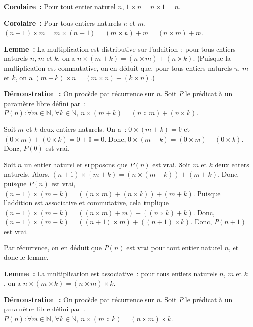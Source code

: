    \done 

\medskip

\noindent\textbf{Corolaire :} Pour tout entier naturel $n$, $1 \times n = n \times 1 = n$. 

\medskip

\noindent\textbf{Corolaire :} Pour tous entiers naturels $n$ et $m$, $(n+1) \times m = m \times (n+1) = (m \times n) + m = (n \times m) + m$. 

\medskip

\noindent\textbf{Lemme :} La multiplication est distributive sur l'addition : pour tous entiers naturels $n$, $m$ et $k$, on a $n \times (m + k) = (n \times m) + (n \times k)$.
    (Puisque la multiplication est commutative, on en déduit que, pour tous entiers naturels $n$, $m$ et $k$, on a $(m + k) \times n = (m \times n) + (k \times n)$.)

\medskip

\noindent\textbf{Démonstration :} On procède par récurrence sur $n$. 
    Soit $P$ le prédicat à un paramètre libre défini par : $P(n): \forall m \in \mathbb{N}, \, \forall k \in \mathbb{N}, \, n \times (m + k) = (n \times m) + (n \times k)$.

    Soit $m$ et $k$ deux entiers naturels. 
    On a : $0 \times (m+k) = 0$ et $(0 \times m) + (0 \times k) = 0 + 0 = 0$. 
    Donc, $0 \times (m+k) = (0 \times m) + (0 \times k)$. 
    Donc, $P(0)$ est vrai. 

    Soit $n$ un entier naturel et supposons que $P(n)$ est vrai. 
    Soit $m$ et $k$ deux enters naturels. 
    Alors, $(n+1) \times (m + k) = (n \times (m + k)) + (m + k)$. 
    Donc, puisque $P(n)$ est vrai, $(n+1) \times (m + k) = ((n \times m) + (n \times k)) + (m + k)$. 
    Puisque l'addition est associative et commutative, cela implique $(n+1) \times (m + k) = ((n \times m) + m) + ((n \times k) + k)$. 
    Donc, $(n+1) \times (m + k) = ((n+1) \times m) + ((n+1) \times k)$. 
    Donc, $P(n+1)$ est vrai. 

    Par récurrence, on en déduit que $P(n)$ est vrai pour tout entier naturel $n$, et donc le lemme.

   \done 

\medskip

\noindent\textbf{Lemme :} La multiplication est associative : pour tous entiers naturels $n$, $m$ et $k$, on a $n \times (m \times k) = (n \times m) \times k$.

\medskip

\noindent\textbf{Démonstration :} On procède par récurrence sur $n$. 
    Soit $P$ le prédicat à un paramètre libre défini par : $P(n): \forall m \in \mathbb{N}, \, \forall k \in \mathbb{N}, \, n \times (m \times k) = (n \times m) \times k$.

